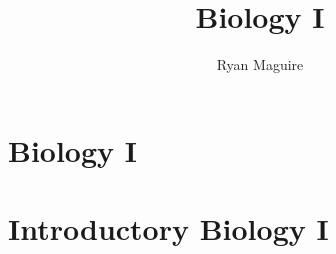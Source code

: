 \documentclass[crop=false,class=book,oneside]{standalone}
\begin{document}
    \ifx\ifbiocourses\undefined
        \title{Biology I}
        \author{Ryan Maguire}
        \date{\vspace{-5ex}}
        \maketitle
        \tableofcontents
        \listoffigures
        \clearpage
        \chapter*{Biology I}
        \setcounter{chapter}{1}
    \else
        \chapter{Introductory Biology I}
    \fi
\end{document}

